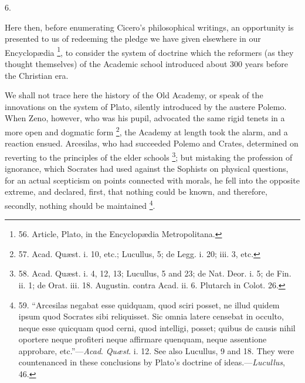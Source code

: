 6.

Here then, before enumerating
Cicero's philosophical writings, an opportunity is presented to us of
redeeming the pledge we have given elsewhere in our Encyclopædia \footnote{56. Article, Plato, in the
Encyclopædia Metropolitana.}, to consider the system of doctrine which the reformers (as
they thought themselves) of the Academic school introduced about 300
years before the Christian era.

We shall not trace here the
history of the Old Academy, or speak of the innovations on the system
of Plato, silently introduced by the austere Polemo. When Zeno,
however, who was his pupil, advocated the same rigid tenets in a more
open and dogmatic form \footnote{57. Acad. Quæst. i. 10, etc.;
Lucullus, 5; de Legg. i. 20; iii. 3, etc.},
the Academy at length took the alarm, and a reaction ensued. Arcesilas,
who had succeeded Polemo and Crates, determined on reverting to the
principles of the elder schools \footnote{58. Acad. Quæst. i. 4, 12,
13; Lucullus, 5 and 23; de Nat. Deor. i. 5; de Fin. ii. 1; de Orat.
iii. 18. Augustin. contra Acad. ii. 6. Plutarch in Colot. 26.}; but mistaking the profession of ignorance, which Socrates had
used against the Sophists on physical questions, for an actual
scepticism on points connected with morals, he fell into the opposite
extreme, and declared, first, that nothing could be known, and
therefore, secondly, nothing should be maintained \footnote{59. ``Arcesilas negabat esse
quidquam, quod sciri posset, ne illud quidem ipsum quod Socrates sibi
reliquisset. Sic omnia latere censebat in occulto, neque esse quicquam
quod cerni, quod intelligi, posset; quibus de causis nihil oportere
neque profiteri neque affirmare quenquam, neque assentione approbare,
etc.''—\emph{Acad}. \emph{Quæst}. i. 12. See also Lucullus, 9 and
18. They were countenanced in these conclusions by Plato's doctrine of
ideas.—\emph{Lucullus}, 46.}.

